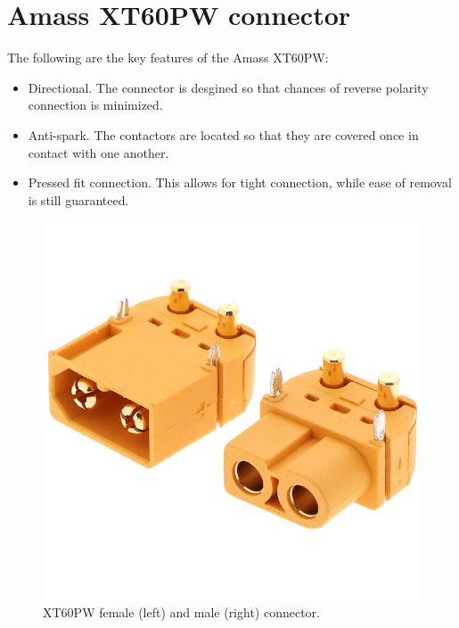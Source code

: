 \documentclass[../main.tex]{subfiles}
\begin{document}
    \section{Amass XT60PW connector}
    The following are the key features of the Amass XT60PW:
    \begin{itemize}
        \item Directional. The connector is desgined so that chances of reverse polarity connection is minimized.
        \item Anti-spark. The contactors are located so that they are covered once in contact with one another.
        \item Pressed fit connection. This allows for tight connection, while ease of removal is still guaranteed. 
    \end{itemize}
    \begin{figure}[!h]
        \centerline{\includegraphics[width=0.5\linewidth]{media/XT60PW.png}}
        \caption{XT60PW female (left) and male (right) connector.}
        \label{fig:XT60PW}
    \end{figure}
\end{document}
